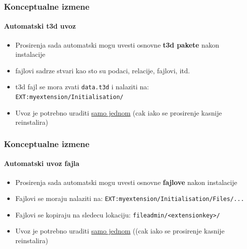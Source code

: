 
\begin{frame}[fragile]
	\frametitle{Konceptualne izmene}
	\framesubtitle{Automatski t3d uvoz}

	\begin{itemize}
		\item Prosirenja sada automatski mogu uvesti osnovne \textbf{t3d pakete}\newline
			 nakon instalacije
		\item fajlovi sadrze stvari kao sto su podaci, relacije, fajlovi, itd.
		\item t3d fajl se mora zvati \texttt{data.t3d} i nalaziti na:\newline
			\texttt{EXT:myextension/Initialisation/}

		\item Uvoz je potrebno uraditi \underline{samo jednom}\newline
			(cak iako se prosirenje kasnije reinstalira)

	\end{itemize}

\end{frame}


\begin{frame}[fragile]
	\frametitle{Konceptualne izmene}
	\framesubtitle{Automatski uvoz fajla}

	\begin{itemize}
		\item Prosirenja sada automatski mogu uvesti osnovne \textbf{fajlove}\newline
			nakon instalacije
		\item Fajlovi se moraju nalaziti na:\newline
			\texttt{EXT:myextension/Initialisation/Files/...}
		\item Fajlovi se kopiraju na sledecu lokaciju:\newline
			\texttt{fileadmin/<extensionkey>/}
		\item Uvoz je potrebno uraditi \underline{samo jednom}\newline
			((cak iako se prosirenje kasnije reinstalira)

	\end{itemize}

\end{frame}

